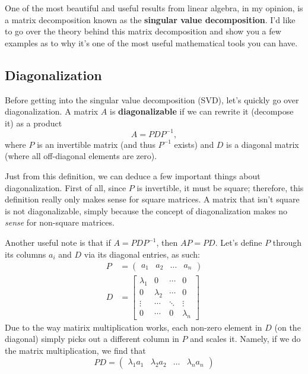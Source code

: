 \documentclass[11pt]{article}
\newcommand\del[1]{\left(#1\right)}
\begin{document}
One of the most beautiful and useful results from linear algebra, in my opinion, is a matrix
decomposition known as the \textbf{singular value decomposition}. I'd like to go over the theory
behind this matrix decomposition and show you a few examples as to why it's one of the most useful
mathematical tools you can have.

\subsection*{Diagonalization}

Before getting into the singular value decomposition (SVD), let's quickly go over diagonalization. A
matrix $A$ is \textbf{diagonalizable} if we can rewrite it (decompose it) as a product
\[A = PDP^{-1},\]
where $P$ is an invertible matrix (and thus $P^{-1}$ exists) and $D$ is a diagonal matrix (where all
off-diagonal elements are zero).

Just from this definition, we can deduce a few important things about diagonalization. First of all,
since $P$ is invertible, it must be square; therefore, this definition really only makes sense for
square matrices. A matrix that isn't square is not diagonalizable, simply because the concept of
diagonalization makes no \emph{sense} for non-square matrices. 

Another useful note is that if $A = PDP^{-1}$, then $AP = PD$.
Let's define $P$ through its columns $a_i$ and $D$ via its diagonal entries, as such:
\begin{align*}
    P &= \del{\begin{matrix}a_1 & a_2 & \dots & a_n\end{matrix}} \\
    D &= \begin{bmatrix}
        \lambda_1   & 0         & \cdots & 0 \\
        0           & \lambda_2 & \cdots & 0 \\
        \vdots      & \cdots    & \ddots & \vdots \\
        0           & \cdots    & 0      & \lambda_n
    \end{bmatrix}
\end{align*}
Due to the way matirix multiplication works, each non-zero element in $D$ (on the diagonal) simply
picks out a different column in $P$ and scales it. Namely, if we do the matrix multiplication, we
find that 
\[PD = \del{\begin{matrix}\lambda_1 a_1 & \lambda_2 a_2 & \dots & \lambda_n a_n\end{matrix}}\]
\end{document}
